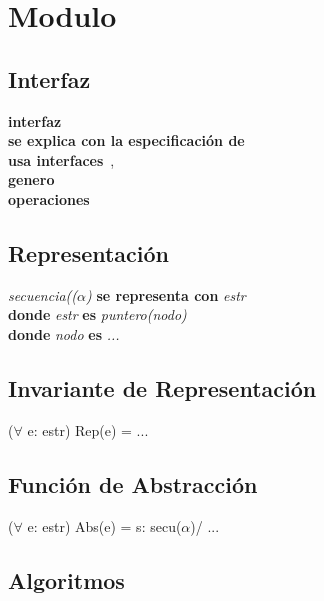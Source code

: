 \section*{Modulo }

\vspace{22pt}

\subsection*{Interfaz}
\textbf{interfaz}\ \\
\textbf{se explica con la especificaci\'on de}\ \\
\textbf{usa interfaces}\ , \\
\textbf{genero}\ \\
\textbf{operaciones}\\

\subsection*{Representaci\'on}
\textit{secuencia(($\alpha$)} \textbf{se representa con} \textit{estr}\\
\textbf{donde} \textit{estr} \textbf{es} \textit{puntero(nodo)}\\
\textbf{donde} \textit{nodo} \textbf{es} \textit{...}\\

\subsection*{Invariante de Representaci\'on}
\vspace{11pt}
($\forall$ e: estr) Rep(e) = ...
\vspace{33pt}

\subsection*{Funci\'on de Abstracci\'on}
\vspace{11pt}
($\forall$ e: estr) Abs(e) = s: secu($\alpha$)/ ...
\vspace{33pt}

\subsection*{Algoritmos}